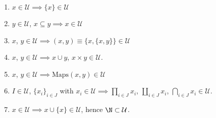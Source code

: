 \documentclass[notes.tex]{subfiles}
\begin{document}
\begin{lemma}
  \label{lemma:properties_of_universes}
  \leavevmode
  \begin{enumerate}
    \item $x \in \mathcal{U} \implies \{x\} \in \mathcal{U}$

    \item $y \in \mathcal{U}$, $x \subseteq y \implies x \in \mathcal{U}$

    \item $x$, $y \in \mathcal{U} \implies (x, y) \equiv \{x, \{x, y\}\} \in \mathcal{U}$

    \item $x$, $y \in \mathcal{U} \implies x \cup y$, $x \times y \in \mathcal{U}$.

    \item $x$, $y \in \mathcal{U} \implies \mathrm{Maps}(x, y) \in \mathcal{U}$

    \item $I \in \mathcal{U}$, $\{x_{i}\}_{i \in J}$ with $x_{i} \in \mathcal{U} \implies \prod_{i \in J} x_{i}$, $\coprod_{i \in J} x_{i}$, $\bigcap_{i \in J} x_{i} \in \mathcal{U}$.

    \item $x \in \mathcal{U} \implies x \cup \{x\} \in \mathcal{U}$, hence $\N \subset \mathcal{U}$.
  \end{enumerate}
\end{lemma}
\end{document}
